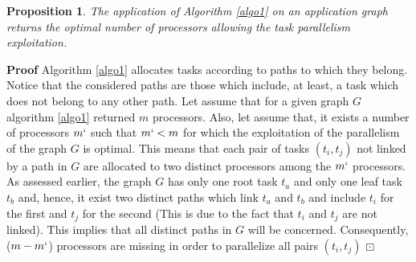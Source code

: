 \documentclass{ijcaArticle}
\newtheorem{Proposition}{Proposition}
\begin{document}
\begin{Proposition}\label{gamma} 
The application of Algorithm \ref{algo1} on an application graph returns the optimal number of processors allowing the task parallelism exploitation. 
\end{Proposition}
\vskip2mm 
\textbf{Proof}
Algorithm \ref{algo1} allocates tasks according to paths to which they belong.  Notice that the considered paths are those which include, at least, a task which does not
belong to any other path.
Let assume that for a given graph $G$ algorithm \ref{algo1} returned $m$ processors. Also, let assume that, it exists a number of processors $m \lq{}$ such that $m \lq{} < m$ for which the exploitation of the parallelism of the graph $G$ is optimal.  
This means that each pair of tasks $(t_{i},t_j)$ not linked by a path in $G$ are allocated to two distinct  processors among the $m \lq{}$ processors. As assessed earlier, the graph $G$ has only one root task $t_a$ and only one leaf task $t_b$ and, hence, it exist two distinct paths which link $t_a$ and $t_b$ and include $t_i$ for the first and $t_j$ for the second (This is due to the fact that $t_i$ and $t_j$ are not linked). This implies that all distinct paths in $G$ will be concerned.  Consequently, ($m - m \lq{}$) processors are missing in order to parallelize all pairs $(t_{i},t_j)$ $\boxdot$
\end{document}
